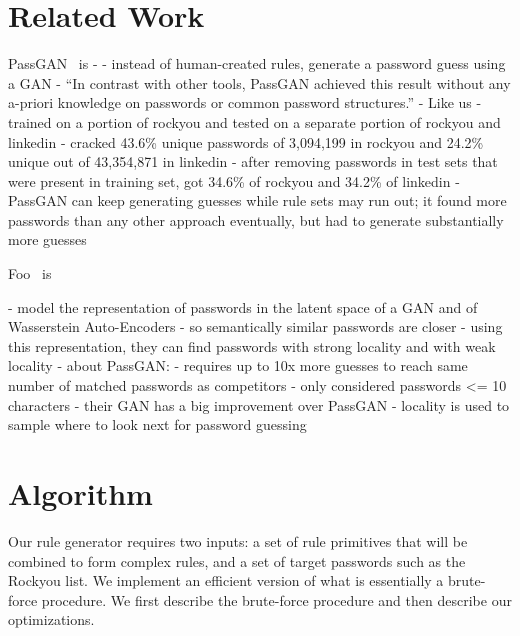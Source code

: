 \documentclass[letterpaper,twocolumn,10pt]{article}
\begin{document}



\section{Related Work}

PassGAN~\cite{hitaj2019passgan} is
- - instead of human-created rules, generate a password guess using a GAN
- “In contrast with other tools, PassGAN achieved this result without any
a-priori knowledge on passwords or common password structures.”
    - Like us
- trained on a portion of rockyou and tested on a separate portion of rockyou
and linkedin
    - cracked 43.6\% unique passwords of 3,094,199 in rockyou and 24.2\% unique
out of 43,354,871 in linkedin
    - after removing passwords in test sets that were present in training set,
got 34.6\% of rockyou and 34.2\% of linkedin
- PassGAN can keep generating guesses while rule sets may run out; it found more
passwords than any other approach eventually, but had to generate substantially
more guesses

Foo~\cite{pasquini2021improving} is

- model the representation of passwords in the latent space of a GAN and of
Wasserstein Auto-Encoders
    - so semantically similar passwords are closer
- using this representation, they can find passwords with strong locality and
with weak locality
- about PassGAN:
    - requires up to 10x more guesses to reach same number of matched passwords
as competitors
    - only considered passwords <= 10 characters
- their GAN has a big improvement over PassGAN
- locality is used to sample where to look next for password guessing

\section{Algorithm}
\label{sec:algorithm}

Our rule generator requires two inputs: a set of rule primitives that will be
combined to form complex rules, and a set of target passwords such as the
Rockyou list. We implement an efficient version of what is essentially a
brute-force procedure. We first describe the brute-force procedure and then
describe our optimizations.
\end{document}
